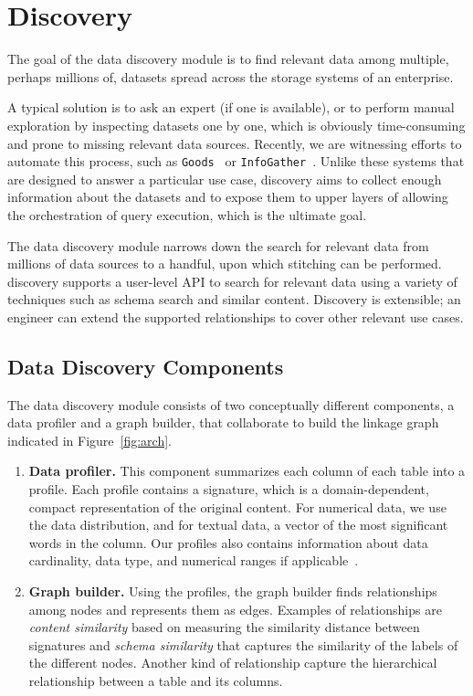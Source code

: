 \section{Discovery}
\label{sec:discovery}

The goal of the data discovery module is to find relevant data among multiple, perhaps millions of, datasets spread across the storage systems of an enterprise. 

A typical solution is to ask an expert (if one is available), or to perform manual exploration by inspecting datasets one by one, which is obviously time-consuming and prone to missing relevant data sources. 
Recently, we are witnessing efforts to automate this process, such as \texttt{Goods}~\cite{DBLP:conf/sigmod/HalevyKNOPRW16} or \texttt{InfoGather}~\cite{ref}. Unlike these systems that are designed to answer a particular use case, discovery aims to collect enough information about the datasets and to expose them to upper layers of \dcv allowing the orchestration of query execution, which is the ultimate goal.

The data discovery module narrows down the search for relevant data from millions of data sources to a handful, upon which stitching can be performed. \dcv discovery supports a user-level API to search for relevant data using a variety of techniques such as schema search and similar content. Discovery is extensible; an engineer can extend the supported relationships to cover other relevant use cases.

\subsection{Data Discovery Components}

The data discovery module consists of two conceptually different components, a data profiler and a graph builder, that collaborate to build the linkage graph indicated in Figure~\ref{fig:arch}.

\begin{enumerate}
\item {\bf Data profiler.} This component summarizes each column of each table into a profile. Each profile contains a signature, which is a domain-dependent, compact representation of the original content. 
For numerical data, we use the data distribution, and for textual data,  a vector of the most significant words in the column. 
Our profiles also contains information about data cardinality, data type, and numerical ranges if applicable~\cite{profiling_survey}.  

\item {\bf Graph builder.} Using the profiles, the graph builder finds relationships among nodes and represents them as edges. Examples of relationships are \emph{content similarity} based on measuring the similarity distance between signatures and \emph{schema similarity} that captures the similarity of the labels of the different nodes. Another kind of relationship capture the hierarchical relationship between a table and its columns. 

\end{enumerate}


